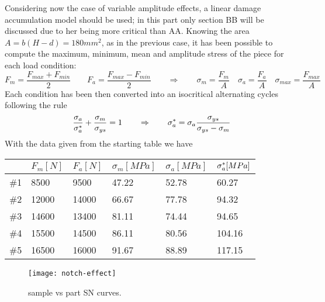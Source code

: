 	\vspace{3mm}
	Considering now the case of variable amplitude effects, a linear damage accumulation model should be used; in this part only section BB will be discussed due to her being more critical than AA. Knowing the area $A = b(H-d) = 180mm^2$, as in the previous case, it has been possible to compute the maximum, minimum, mean and amplitude stress of the piece for each load condition:
	\[ F_m = \frac{F_{max} + F_{min}}{2} \qquad F_a = \frac{F_{max} - F_{min}}{2} \qquad \Rightarrow \qquad \sigma_m = \frac{F_m}{A} \quad \sigma_a = \frac{F_a}{A} \quad \sigma_{max} = \frac{F_{max}}{A} \]
	Each condition has been then converted into an isocritical alternating cycles following the rule
	\[ \frac{\sigma_{a}}{\sigma_{a}^*} + \frac{\sigma_{m}}{\sigma_{ys}}  = 1 \qquad \Rightarrow \qquad \sigma_{a}^* = \sigma_{a} \frac{\sigma_{ys}}{\sigma_{ys}-\sigma_{m}}\]
	With the data given from the starting table we have	
	\begin{center}
		\begin{tabular}{ c M{2cm} M{2cm} | M{2cm} M{2cm} M{2cm} }
			&  $F_m [N]$ &  $F_a[N]$ & $\sigma_m [MPa]$ & $\sigma_a [MPa]$ & $\sigma_{a}^* [MPa]$ \\ \hline
			\#1 & 8500 & 9500 & 47.22 &  52.78 & 60.27\\
			\#2 & 12000 & 14000 & 66.67 & 77.78 & 94.32 \\
			\#3 & 14600 & 13400 & 81.11 & 74.44 & 94.65  \\
			\#4 & 15500 & 14500 & 86.11 & 80.56 & 104.16 \\
			\#5 & 16500 & 16000 & 91.67 & 88.89 & 117.15
		\end{tabular}
	\end{center} \noindent
	\begin{SCfigure}[1][b]
		\centering \texttt{[image: notch-effect]}
		\caption{sample vs part SN curves.} \label{ex:notcheffetc}
	\end{SCfigure}
	
